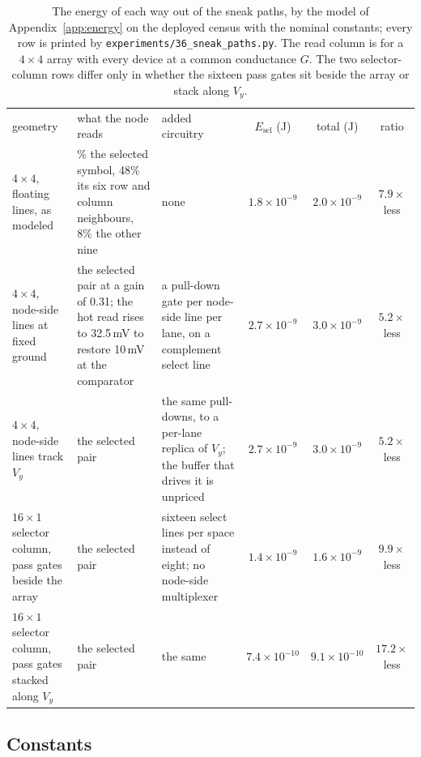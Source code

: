 \documentclass[reprint,amsmath,amssymb,aps,nofootinbib]{revtex4-2}
\begin{document}
\begin{table}[t!]
\caption{The energy of each way out of the sneak paths, by the
model of Appendix~\ref{app:energy} on the deployed census with the
nominal constants; every row is printed by
\texttt{experiments/36\_sneak\_paths.py}. The read column is for a
$4 \times 4$ array with every device at a common conductance $G$. The
two selector-column rows differ only in whether the sixteen pass
gates sit beside the array or stack along $V_y$.\label{tab:sneak}}
\footnotesize
\begin{ruledtabular}
\begin{tabular}{>{\raggedright\arraybackslash}p{3.4cm}>{\raggedright\arraybackslash}p{4.0cm}>{\raggedright\arraybackslash}p{3.9cm}ccc}
geometry & what the node reads & added circuitry & $E_{\mathrm{sel}}$ (J) &
  total (J) & ratio \\
\colrule
$4 \times 4$, floating lines, as modeled & 44\% the selected symbol,
  48\% its six row and column neighbours, 8\% the other nine & none &
  $1.8\times10^{-9}$ & $2.0\times10^{-9}$ & $7.9\times$ less \\
$4 \times 4$, node-side lines at fixed ground & the selected pair at a
  gain of 0.31; the hot read rises to 32.5\,mV to restore 10\,mV at the
  comparator & a pull-down gate per node-side line per lane, on a
  complement select line & $2.7\times10^{-9}$ & $3.0\times10^{-9}$ &
  $5.2\times$ less \\
$4 \times 4$, node-side lines track $V_y$ & the selected pair & the
  same pull-downs, to a per-lane replica of $V_y$; the buffer that
  drives it is unpriced & $2.7\times10^{-9}$ & $3.0\times10^{-9}$ &
  $5.2\times$ less \\
$16 \times 1$ selector column, pass gates beside the array & the
  selected pair & sixteen select lines per space instead of eight; no
  node-side multiplexer & $1.4\times10^{-9}$ & $1.6\times10^{-9}$ &
  $9.9\times$ less \\
$16 \times 1$ selector column, pass gates stacked along $V_y$ & the
  selected pair & the same & $7.4\times10^{-10}$ & $9.1\times10^{-10}$
  & $17.2\times$ less \\
\end{tabular}
\end{ruledtabular}
\end{table}

\subsection{Constants}\label{app:constants}
\end{document}

